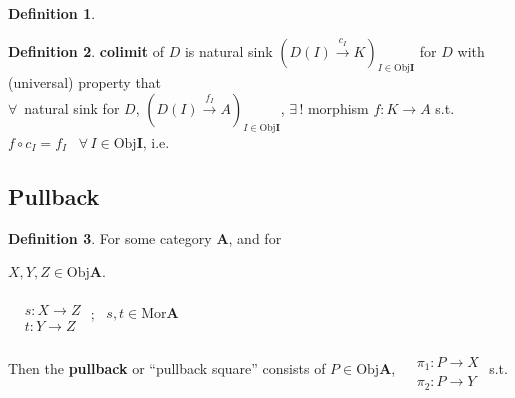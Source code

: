 \documentclass[twoside,landscape,10pt]{amsart}
\theoremstyle{plain}
\theoremstyle{definition}
\newtheorem{definition}{Definition}
\theoremstyle{remark}
\begin{document}
\begin{multicols*}{2}
\begin{definition}
\end{definition}

\begin{definition}
  \textbf{colimit} of $D$ is natural sink $(D(I) \xrightarrow{ c_I} K)_{I \in \text{Obj}\mathbf{I}}$ for $D$ with \\
(universal) property that \\
$\forall \, $ natural sink for $D$, $(D(I) \xrightarrow{ f_I} A)_{I\in \text{Obj}\mathbf{I}}$, $\exists \, !$ morphism $f:K \to A$ s.t. $f\circ c_I = f_I$ \quad \,  $\forall \, I \in \text{Obj}\mathbf{I}$, i.e.

\end{definition}

\subsection{Pullback}

\begin{definition}
  For some category $\mathbf{A}$, and for 


$X,Y,Z \in \text{Obj}\mathbf{A}$.  

$\begin{aligned} & \quad \\
  & s : X \to Z \\
  & t: Y \to Z \end{aligned}$ ; \qquad \, $s,t \in \text{Mor}\mathbf{A}$

Then the \textbf{pullback} or ``pullback square'' consists of $P \in \text{Obj}\mathbf{A}$, $\begin{aligned} & \quad \\
  & \pi_1 : P \to X \\
  & \pi_2: P \to Y \end{aligned}$ s.t. 


\end{definition}
\end{multicols*}
\end{document}
